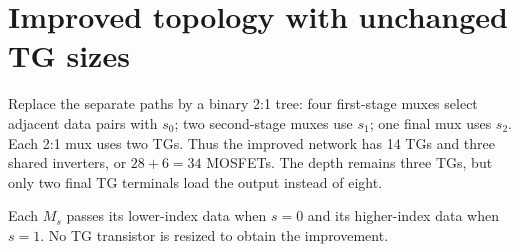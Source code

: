 \documentclass[11pt,a4paper]{article}
\begin{document}
\section*{Improved topology with unchanged TG sizes}
Replace the separate paths by a binary 2:1 tree: four first-stage muxes select
adjacent data pairs with $s_0$; two second-stage muxes use $s_1$; one final mux
uses $s_2$. Each 2:1 mux uses two TGs. Thus the improved network has 14 TGs and
three shared inverters, or $28+6=34$ MOSFETs. The depth remains three TGs,
but only two final TG terminals load the output instead of eight.
\begin{center}\end{center}
Each $M_s$ passes its lower-index data when $s=0$ and its higher-index data
when $s=1$. No TG transistor is resized to obtain the improvement.
\end{document}

